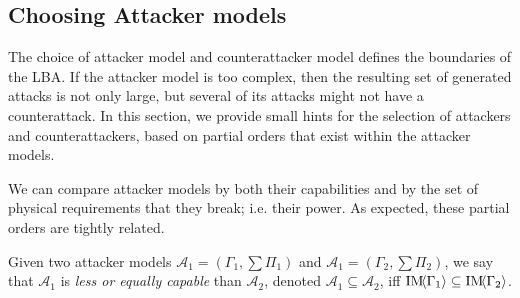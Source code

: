 {%

\subsection{Choosing Attacker models}
The choice of attacker model and counterattacker model defines the boundaries of the LBA. If the attacker model is too complex, then the resulting set of generated attacks is not only large, but several of its attacks might not have a counterattack. In this section, we provide small hints for the selection of attackers and counterattackers, based on partial orders that exist within the attacker models.

We can compare attacker models by both their capabilities and by the set of physical requirements that they break; i.e. their power. As expected, these partial orders are tightly related.
\begin{definition}
  Given two attacker models $\mathcal{A}_1=(\Gamma_1,\sum \Pi_1)$ and $\mathcal{A}_1=(\Gamma_2,\sum \Pi_2)$, we say that $\mathcal{A}_1$ is \emph{less or equally capable} than $\mathcal{A}_2$, denoted $\mathcal{A}_1\subseteq \mathcal{A}_2$, iff $\text{IM}\!{{\left<\Gamma_1\right>}}\subseteq \text{IM}\!{{\left<\Gamma_2\right>}}$. 
  

\end{definition}}
